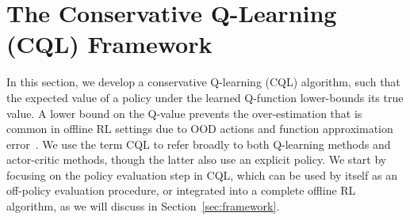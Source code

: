 \vspace{-5pt}
\section{The Conservative Q-Learning (CQL) Framework}
\vspace{-5pt}
In this section, we develop a conservative Q-learning (CQL) algorithm, such that the expected value of a policy under the learned Q-function lower-bounds its true value. A lower bound on the Q-value prevents the over-estimation that is common in offline RL settings due to OOD actions and function approximation error~\citep{levine2020offline,kumar2019stabilizing}. {We use the term CQL to refer broadly to both Q-learning methods and actor-critic methods, though the latter also use an explicit policy.}
We start by focusing on the policy evaluation step in CQL, which can be used by itself as an off-policy evaluation procedure, or integrated into a complete offline RL algorithm, as we will discuss in Section~\ref{sec:framework}.

\vspace{-5pt}
